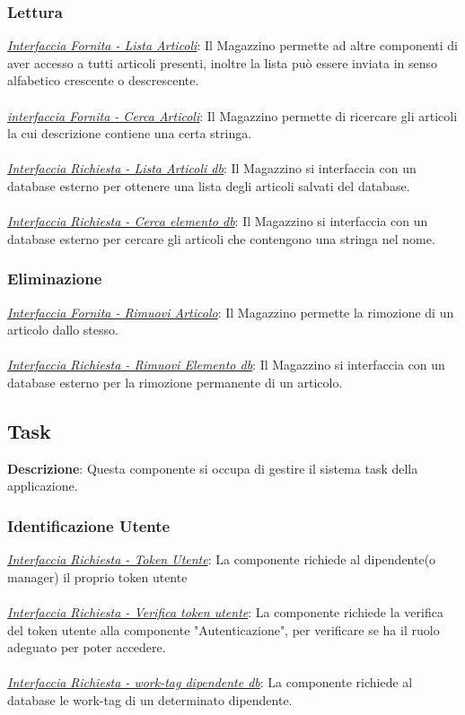 \documentclass{report}
\begin{document}
\subsubsection*{\indent \indent Lettura}
\uline{\textit{Interfaccia Fornita - Lista Articoli}}:
Il Magazzino permette ad altre componenti di aver accesso a tutti articoli presenti, inoltre la lista può essere inviata in senso alfabetico crescente o descrescente.\\ \\
\uline{\textit{interfaccia Fornita - Cerca Articoli}}:
Il Magazzino permette di ricercare gli articoli la cui descrizione contiene una certa stringa.\\ \\
\uline{\textit{Interfaccia Richiesta - Lista Articoli db}}:
Il Magazzino si interfaccia con un database esterno per ottenere una lista degli articoli salvati del database.\\ \\
\uline{\textit{Interfaccia Richiesta - Cerca elemento db}}:
Il Magazzino si interfaccia con un database esterno per cercare gli articoli che contengono una stringa nel nome.
\subsubsection*{\indent \indent Eliminazione}
\uline{\textit{Interfaccia Fornita - Rimuovi Articolo}}:
Il Magazzino permette la rimozione di un articolo dallo stesso.\\ \\
\uline{\textit{Interfaccia Richiesta - Rimuovi Elemento db}}:
Il Magazzino si interfaccia con un database esterno per la rimozione permanente di un articolo.
\subsection*{Task}

\textbf{Descrizione}: Questa componente si occupa di gestire il sistema task della applicazione.
\subsubsection*{\indent \indent Identificazione Utente}
\uline{\textit{Interfaccia Richiesta - Token Utente}}:
La componente richiede al dipendente(o manager) il proprio token utente \\ \\
\uline{\textit{Interfaccia Richiesta - Verifica token utente}}: 
La componente richiede la verifica del token utente alla componente "Autenticazione", per verificare se ha il ruolo adeguato per poter accedere. \\ \\ 
\uline{\textit{Interfaccia Richiesta - work-tag dipendente db}}: 
La componente richiede al database le work-tag di un determinato dipendente. 
\end{document}
